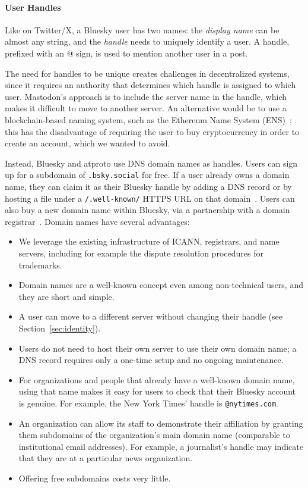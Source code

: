 \documentclass[sigconf]{acmart}
\begin{document}
\paragraph{User Handles}

Like on Twitter/X, a Bluesky user has two names: the \emph{display name} can be almost any string, and the \emph{handle} needs to uniquely identify a user.
A handle, prefixed with an @ sign, is used to mention another user in a post.

The need for handles to be unique creates challenges in decentralized systems, since it requires an authority that determines which handle is assigned to which user.
Mastodon's approach is to include the server name in the handle, which makes it difficult to move to another server.
An alternative would be to use a blockchain-based naming system, such as the Ethereum Name System (ENS)~\cite{ENS}; this has the disadvantage of requiring the user to buy cryptocurrency in order to create an account, which we wanted to avoid.

Instead, Bluesky and atproto use DNS domain names as handles.
Users can sign up for a subdomain of \texttt{.bsky.social} for free.
If a user already owns a domain name, they can claim it as their Bluesky handle by adding a DNS record or by hosting a file under a \texttt{/.well-known/} HTTPS URL on that domain~\cite{DomainHandle}.
Users can also buy a new domain name within Bluesky, via a partnership with a domain registrar~\cite{PurchaseDomain}.
Domain names have several advantages:
\begin{itemize}
    \item We leverage the existing infrastructure of ICANN, registrars, and name servers, including for example the dispute resolution procedures for trademarks.
    \item Domain names are a well-known concept even among non-technical users, and they are short and simple.
    \item A user can move to a different server without changing their handle (see Section~\ref{sec:identity}).
    \item Users do not need to host their own server to use their own domain name; a DNS record requires only a one-time setup and no ongoing maintenance.
    \item For organizations and people that already have a well-known domain name, using that name makes it easy for users to check that their Bluesky account is genuine. For example, the New York Times' handle is \texttt{@nytimes.com}.
    \item An organization can allow its staff to demonstrate their affiliation by granting them subdomains of the organization's main domain name (comparable to institutional email addresses). For example, a journalist's handle may indicate that they are at a particular news organization.
    \item Offering free subdomains costs very little.
\end{itemize}
\end{document}
